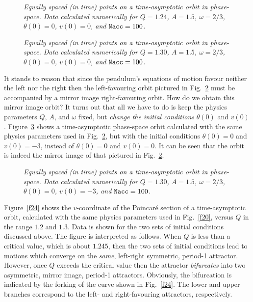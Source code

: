 \begin{figure}
\epsfysize=3in
\centerline{}
\caption{\em Equally spaced (in time) points on a time-asymptotic orbit in phase-space.
Data calculated numerically for $Q=1.24$, $A=1.5$, $\omega=2/3$, $\theta(0)=0$,
$v(0)=0$, and ${\tt Nacc} = 100$. }\label{f21}
\end{figure}

\begin{figure}
\epsfysize=3in
\centerline{}
\caption{\em Equally spaced (in time) points on a time-asymptotic orbit in phase-space.
Data calculated  
numerically  for $Q=1.30$, $A=1.5$, $\omega=2/3$, $\theta(0)=0$,
$v(0)=0$, and ${\tt Nacc} = 100$. }\label{f22}
\end{figure}

It stands to reason that since the pendulum's equations of motion favour neither the
left nor the right then the left-favouring orbit pictured in Fig.~\ref{f22} must be accompanied
by a mirror image right-favouring orbit. How do we obtain this mirror image orbit?
It turns out that all we have to do is keep the physics  parameters $Q$, $A$, and $\omega$
fixed, but {\em change the initial conditions} $\theta(0)$ and $v(0)$. Figure~\ref{f23} shows
a time-asymptotic phase-space orbit calculated with the same physics parameters  used in Fig.~\ref{f22}, but
with the initial conditions $\theta(0)=0$ and $v(0)=-3$, instead of $\theta(0)=0$ and
$v(0)=0$. It can be seen that the orbit is indeed the mirror image of that pictured in Fig.~\ref{f22}.

\begin{figure}
\epsfysize=3in
\centerline{}
\caption{\em Equally spaced (in time) points on a time-asymptotic orbit in phase-space. Data
 calculated numerically for $Q=1.30$, $A=1.5$, $\omega=2/3$, $\theta(0)=0$,
$v(0)=-3$, and  ${\tt Nacc} = 100$. }\label{f23}
\end{figure}

Figure~\ref{f24} shows the $v$-coordinate of the Poincar\'{e} section of a time-asymptotic orbit,
calculated with the same physics parameters used in Fig.~\ref{f20}, versus
  $Q$ in the range $1.2$ and $1.3$. Data is shown for the two sets of
initial conditions discussed above. The figure is interpreted as
follows. When $Q$ is less than a critical value,
which is about $1.245$, then the two sets of initial conditions lead to motions
which converge on the {\em same}, left-right symmetric, 
period-1 attractor. However, once
$Q$ exceeds the critical value then the attractor {\em bifurcates} into two 
asymmetric, mirror image,  period-1
attractors.  Obviously, the bifurcation is indicated by the forking of the
curve shown in Fig.~\ref{f24}. The lower and upper branches correspond to the left- and right-favouring
 attractors, respectively.

